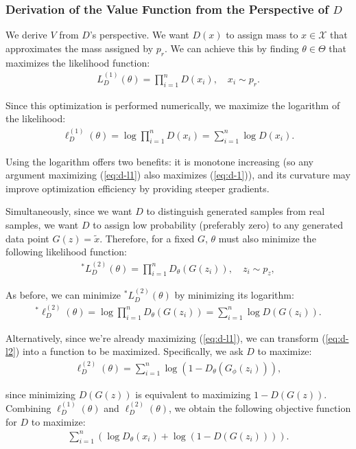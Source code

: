 \subsubsection{Derivation of the Value Function from the Perspective of $D$}
\label{sec:derivation-d}

We derive $V$ from $D$'s perspective. We want $D(x)$ to assign mass to $x \in \mathcal{X}$ that approximates the mass assigned by $p_r$. We can achieve this by finding $\theta \in \Theta$ that maximizes the likelihood function:
\begin{align}
	\label{eq:d-1}
	L_{D}^{(1)}(\theta) = \prod_{i=1}^n D(x_i), \quad x_i \sim p_r.
\end{align}

Since this optimization is performed numerically, we maximize the logarithm of the likelihood:
\begin{align}
	\label{eq:d-l1}
	\ell_{D}^{(1)}(\theta) = \log \prod_{i=1}^n D(x_i) = \sum_{i=1}^n \log D(x_i).
\end{align}

Using the logarithm offers two benefits: it is monotone increasing (so any argument maximizing (\ref{eq:d-l1}) also maximizes (\ref{eq:d-1})), and its curvature may improve optimization efficiency by providing steeper gradients.

Simultaneously, since we want $D$ to distinguish generated samples from real samples, we want $D$ to assign low probability (preferably zero) to any generated data point $G(z) = \tilde{x}$. Therefore, for a fixed $G$, $\theta$ must also minimize the following likelihood function:
\begin{align}
	^*L_{D}^{(2)}(\theta) = \prod_{i=1}^n D_\theta(G(z_i)), \quad z_i \sim p_z,
\end{align}

As before, we can minimize $^*L_{D}^{(2)}(\theta)$ by minimizing its logarithm:
\begin{align}
	\label{eq:d-l2} ^*\ell_{D}^{(2)}(\theta) = \log \prod_{i=1}^n D_\theta(G(z_i)) = \sum_{i=1}^n \log D(G(z_i)).
\end{align}

Alternatively, since we're already maximizing (\ref{eq:d-l1}), we can transform (\ref{eq:d-l2}) into a function to be maximized. Specifically, we ask $D$ to maximize:
\begin{align}
	\ell_{D}^{(2)}(\theta) = \sum_{i=1}^n \log{(1 - D_\theta(G_\phi(z_i)))},
\end{align}

since minimizing $D(G(z))$ is equivalent to maximizing $1 - D(G(z))$. Combining $\ell_{D}^{(1)}(\theta)$ and $\ell_{D}^{(2)}(\theta)$, we obtain the following objective function for $D$ to maximize:
\begin{align}
	\sum_{i=1}^n \left( \log D_\theta(x_i) + \log{(1 - D(G(z_i)))} \right).
\end{align}

